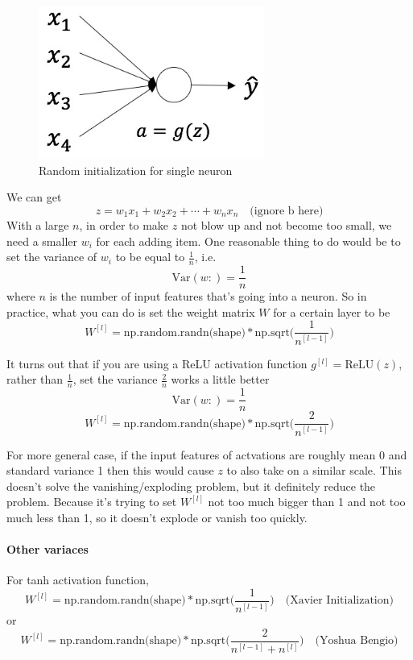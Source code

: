 \documentclass[UTF8]{article}
\newcommand{\Matrix}[1]{\boldsymbol{\mathit{#1}}}   %
\begin{document}
\begin{figure}[htb]
    \centering
    \includegraphics[width=20em]{figures/random-initialization-for-single-neuron}
    \caption{Random initialization for single neuron}
    \label{fig:random-initialization-for-single-neuron}
\end{figure}

We can get
$$ z = w_1 x_1 + w_2 x_2 + \cdots + w_n x_n \quad \text{(ignore b here)} $$
With a large $n$, in order to make $z$ not blow up and not become too small, we need a smaller
$w_i$ for each adding item. One reasonable thing to do would be to set the variance of $w_i$ to be
equal to $\frac{1}{n}$, i.e.
$$ \text{Var}(w:) = \frac{1}{n} $$
where $n$ is the number of input features that's going into a neuron. So in
practice, what you can do is set the weight matrix $\Matrix{W}$ for a certain layer to be
$$\Matrix{W}^{[l]} = \text{np.random.randn(shape)} * \text{np.sqrt(} \frac{1}{n^{[l-1]}} \text{)}$$

It turns out that if you are using a ReLU activation function $g^{[l]} = \text{ReLU}(z)$, rather
than $\frac{1}{n}$, set the variance $\frac{2}{n}$ works a little better
$$ \text{Var}(w:) = \frac{1}{n} $$
$$\Matrix{W}^{[l]} = \text{np.random.randn(shape)} * \text{np.sqrt(} \frac{2}{n^{[l-1]}} \text{)}$$

For more general case, if the input features of actvations are roughly mean 0 and standard variance
1 then this would cause $z$ to also take on a similar scale. This doesn't solve the
vanishing/exploding problem, but it definitely reduce the problem. Because it's trying to set
$\Matrix{W}^{[l]}$ not too much bigger than 1 and not too much less than 1, so it doesn't explode
or vanish too quickly.

\paragraph{Other variaces}
For tanh activation function,
$$ \Matrix{W}^{[l]} = \text{np.random.randn(shape)} * \text{np.sqrt(} \frac{1}{n^{[l-1]}} \text{)}
\quad \text{(Xavier Initialization)} $$
or
$$ \Matrix{W}^{[l]} = \text{np.random.randn(shape)} * \text{np.sqrt(} \frac{2}{n^{[l-1]} + n^{[l]}}
\text{)} \quad \text{(Yoshua Bengio)} $$
\end{document}
